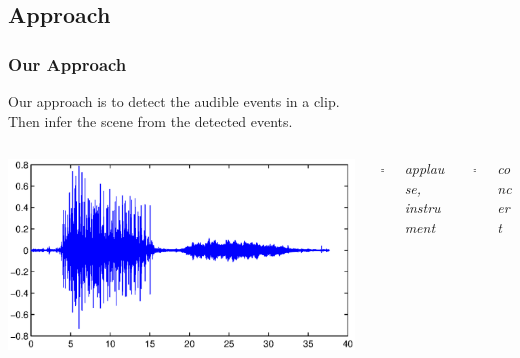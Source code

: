 \documentclass[xcolor=table,slidestop,compress,mathserif]{beamer}
\begin{document}
\subsection{Approach}
\begin{frame}
  \frametitle{Our Approach}
	Our approach is to detect the audible events in a clip. \\
	Then infer the scene from the detected events. 	
		
	\pause
	\vspace{0.5cm}
	\begin{columns}[c]
		\begin{column}{0.5\textwidth}
			\includegraphics[scale=0.4]{./figure/tune_part.eps}
		\end{column}
		\begin{column}{0.05\textwidth}
			$\Rightarrow$
		\end{column}
		\begin{column}{0.2\textwidth}
			\em{applause, instrument}
		\end{column}
		\begin{column}{0.05\textwidth}
			$\Rightarrow$
		\end{column}
		\begin{column}{0.2\textwidth}
			\em{concert}
		\end{column}
	\end{columns}

\end{frame}
\end{document}
